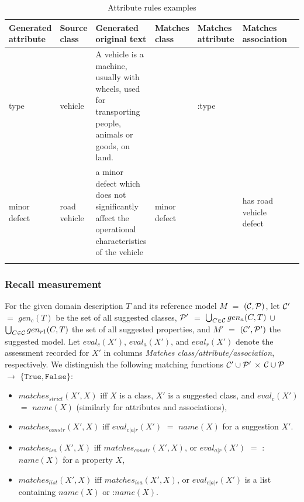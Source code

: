 \begin{table}[!h]
    \scriptsize
    \centering
    \setlength{\tabcolsep}{0.5em}
\begin{tabular}{@{}l>{\raggedright\arraybackslash}p{}>{\raggedright\arraybackslash}p{}>{\raggedright\arraybackslash}p{}>{\raggedright\arraybackslash}p{}>{\raggedright\arraybackslash}p{}>{\raggedright\arraybackslash}p{}@{}}
         Generated attribute & Source class & Generated original text & Matches class & Matches attribute & Matches association \\
    \toprule
    \addlinespace

type & vehicle & A vehicle is a machine, usually with wheels, used for transporting people, animals or goods, on land. & & :type & \\

\addlinespace

minor defect & road vehicle &  a minor defect which does not significantly affect the operational characteristics of the vehicle & minor defect & & has road vehicle defect \\

	\addlinespace
	\bottomrule
	\addlinespace
	\end{tabular}
	\caption{Attribute rules examples}
	\label{tab:attribute-rules}
\end{table}


\subsubsection{Recall measurement}

For the given domain description $T$ and its reference model $M$ $=$ $({\cal C}, {\cal P})$, let ${\cal C}'$ $=$ $gen_c(T)$ be the set of all suggested classes, ${\cal P}'$ $=$ $\bigcup_{C \in {\cal C}} gen_a(C,T)$ $\cup$ $\bigcup_{C \in {\cal C}} gen_{r1}(C,T)$ the set of all suggested properties, and $M'$ $=$ $({\cal C'}, {\cal P}')$ the suggested model.
Let $eval_c(X')$, $eval_a(X')$, and $eval_r(X')$ denote the assessment recorded for $X'$ in columns \emph{Matches class/attribute/association}, respectively.
We distinguish the following matching functions ${\cal C}' \cup {\cal P}'$ $\times$ ${\cal C} \cup {\cal P}$ $\rightarrow$ $\{\mathtt{True}, \mathtt{False}\}$:
\begin{itemize}
    \item $matches_{strict}(X',X)$ iff $X$ is a class, $X'$ is a suggested class, and $eval_c(X')$ $=$ $name(X)$ (similarly for attributes and associations),
    \item $matches_{constr}(X',X)$ iff $eval_{c \vert a \vert r}(X')$ $=$ $name(X)$ for a suggestion $X'$.
    \item $matches_{isa}(X',X)$ iff $matches_{constr}(X',X)$, or $eval_{a \vert r}(X')$ $=$ :$name(X)$ for a property $X$,
    \item $matches_{list}(X',X)$ iff $matches_{isa}(X',X)$, or $eval_{c \vert a \vert r}(X')$ is a list containing $name(X)$ or :$name(X)$.
\end{itemize}

